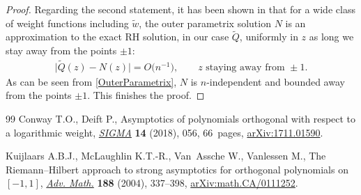 \documentclass[10pt,a4paper]{amsart}
\newcommand{\tw}{\widetilde w}
\newcommand{\tQ}{{\widetilde Q}}
\numberwithin{equation}{section}
\begin{document}
\begin{proof}
Regarding the second statement, it has been shown in \cite[Section~7]{KMVV} that for a wide class of weight functions including $\tw$, the outer parametrix solution $N$ is an approximation to the exact RH solution, in our case $\tQ$, uniformly in $z$ as long we stay away from the points $\pm 1$:
\begin{align*}
 \big|\tQ(z)-N(z)\big| = O\big(n^{-1}\big), \qquad z \mbox{ staying away from } \pm 1.
\end{align*}
As can be seen from \eqref{OuterParametrix}, $N$ is $n$-independent and bounded away from the points $\pm 1$. This finishes the proof.
\end{proof}

\begin{thebibliography}{99}
Conway T.O., Deift P., Asymptotics of polynomials orthogonal with respect to a
 logarithmic weight, \href{https://doi.org/10.3842/SIGMA.2018.056}{\textit{SIGMA}} \textbf{14} (2018), 056, 66~pages,
 \href{https://arxiv.org/abs/1711.01590}{arXiv:1711.01590}.


Kuijlaars A.B.J., McLaughlin K.T.-R., Van~Assche W., Vanlessen M., The
 {R}iemann--{H}ilbert approach to strong asymptotics for orthogonal
 polynomials on {$[-1,1]$}, \href{https://doi.org/10.1016/j.aim.2003.08.015}{\textit{Adv. Math.}} \textbf{188} (2004), 337--398,
 \href{https://arxiv.org/abs/math.CA/0111252}{arXiv:math.CA/0111252}.
\end{thebibliography}
\end{document}
